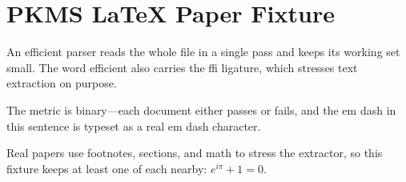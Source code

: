 \documentclass{article}
\begin{document}
\section*{PKMS LaTeX Paper Fixture}

An efficient parser reads the whole file in a single pass and keeps
its working set small. The word efficient also carries the ffi
ligature, which stresses text extraction on purpose.

The metric is binary---each document either passes or fails, and the
em dash in this sentence is typeset as a real em dash character.

Real papers use footnotes, sections, and math to stress the
extractor, so this fixture keeps at least one of each nearby:
$e^{i\pi} + 1 = 0$.
\end{document}
